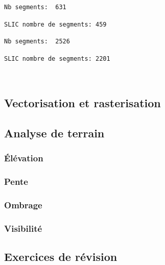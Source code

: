 \documentclass[11pt]{article}
\begin{document}
    \begin{Verbatim}[commandchars=\\\{\}]
Nb segments:  631
    \end{Verbatim}

    \begin{Verbatim}[commandchars=\\\{\}]
SLIC nombre de segments: 459
    \end{Verbatim}

    \begin{Verbatim}[commandchars=\\\{\}]
Nb segments:  2526
    \end{Verbatim}

    \begin{Verbatim}[commandchars=\\\{\}]
SLIC nombre de segments: 2201
    \end{Verbatim}

    \begin{center}
    \end{center}
    { \hspace*{\fill} \\}
    
    \hypertarget{vectorisation-et-rasterisation}{%
\subsection{Vectorisation et
rasterisation}\label{vectorisation-et-rasterisation}}

\hypertarget{analyse-de-terrain}{%
\subsection{Analyse de terrain}\label{analyse-de-terrain}}

\hypertarget{uxe9luxe9vation}{%
\subsubsection{Élévation}\label{uxe9luxe9vation}}

\hypertarget{pente}{%
\subsubsection{Pente}\label{pente}}

\hypertarget{ombrage}{%
\subsubsection{Ombrage}\label{ombrage}}

\hypertarget{visibilituxe9}{%
\subsubsection{Visibilité}\label{visibilituxe9}}

\hypertarget{exercices-de-ruxe9vision}{%
\subsection{Exercices de révision}\label{exercices-de-ruxe9vision}}


    
    
    
\end{document}
